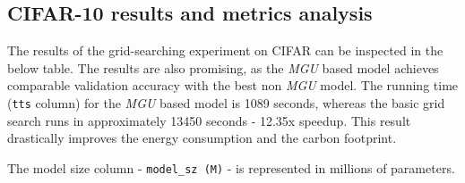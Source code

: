 \documentclass[11pt]{article}
\begin{document}
    \hypertarget{cifar-10-results-and-metrics-analysis}{%
\subsection{CIFAR-10 results and metrics
analysis}\label{cifar-10-results-and-metrics-analysis}}

The results of the grid-searching experiment on CIFAR can be inspected
in the below table. The results are also promising, as the \emph{MGU}
based model achieves comparable validation accuracy with the best non
\emph{MGU} model. The running time (\texttt{tts} column) for the
\emph{MGU} based model is 1089 seconds, whereas the basic grid search
runs in approximately 13450 seconds - 12.35x speedup. This result
drastically improves the energy consumption and the carbon footprint.

The model size column - \texttt{model\_sz\ (M)} - is represented in
millions of parameters.
\end{document}
